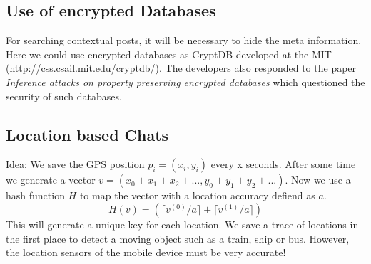 \documentclass{scrartcl}
\begin{document}
\subsection{Use of encrypted Databases}
For searching contextual posts, it will be necessary to hide the meta information. Here we could use encrypted databases as CryptDB developed at the MIT (\url{http://css.csail.mit.edu/cryptdb/}). The developers also responded to the paper  \emph{Inference attacks on property preserving encrypted databases} \cite{INF} which questioned the security of such databases.


  \subsection{Location based Chats}
  Idea: We save the GPS position $p_i = (x_i,y_i)$  every x seconds. After some time
  we generate a vector $v = (x_0+x_1+x_2+..., y_0+y_1+y_2+...)$. Now we use a hash function $H$ to map the vector with a location accuracy defiend as $a$. 
  $$
  H(v) = (\lceil v^{(0)}/a \rceil +\lceil v^{(1)}/a \rceil )
  $$
  This will generate a unique key for each location. We save a trace of locations in the first place to detect a moving object such as a train, ship or bus.  However, the location sensors of the mobile device must be very accurate!
  
  
  
\end{document}
